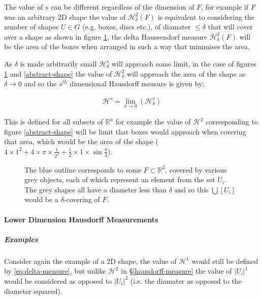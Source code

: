 \documentclass[a4paper,11pt,twoside]{article}
\begin{document}
The value of \(s\) can be different regardless of the dimension of \(F\), for example if \(F\) was an arbitrary 2D shape the value of \(\mathcal{H}_{\delta}^{2}\left(F\right)\)
is equivalent to considering the number of shapes \(U\in G\) (e.g. boxes, discs etc.), of
diamater \(\leq \delta\) that will cover over a shape as shown in figure
\ref{hausdorff-covering}, the delta Haussendorf measure
\(\mathcal{H}^{2}_{\delta} \left(F\right)\) will be the area of the boxes when
arranged in such a way that minimises the area.

As \(\delta\) is made arbitrarily small \(\mathcal{H}_{\delta}^{s}\) will approach some limit, in the case of figures \ref{hausdorff-covering}  and \ref{abstract-shape} the value of \(\mathcal{H}^{2}_{\delta}\) will approach the area of the shape as \(\delta \rightarrow 0\) and so the \(s^{th}\) dimensional Hausdorff measure is given by:

\begin{align}
\mathcal{H}^{s} = \lim_{\delta \rightarrow 0}\left( \mathcal{H}^{s}_{\delta} \right) \label{eq:limit-haus}
\end{align}

This is defined for all subsets of \(\mathbb{R}^n\) for example the value of  \(\mathcal{H}^{2}\) corresponding to figure \ref{abstract-shape} will be limit that boxes would approach when covering that area, which would be the area of the shape (\(4\times 1^2 + 4\times \pi\times \frac{1}{2^2} + \frac{1}{2}\times 1 \times \sin{\frac{\pi}{3}}\)).





\begin{figure}
\centering

\caption{\label{hausdorff-covering}The blue outline corresponds to some \(F \subset \mathbb{R}^{2}\), covered by various grey objects, each of which represent an element from the set \(U_{i}\). The grey shapes all have a diameter less than \(\delta\) and so this  \(\bigcup \left[U_{i}\right]\) would be a \(\delta\)-covering of \(F\).}
\end{figure}




\paragraph{Lower Dimension Hausdorff Measurements}
\label{sec:org5baa1e8}
\subparagraph{Examples}
\label{sec:org53aab8b}
Consider again the example of a 2D shape, the value of \(\mathcal{H}^{1}\) would still be defined by \eqref{eq:delta-measure}, but unlike \(\mathcal{H}^{2}\) in \S \ref{hausdorff-measure} the value of \(\left\lvert U_i \right\rvert^1\) would be considered as opposed to \(\left\lvert U_i \right\rvert^2\) (i.e. the diamater as opposed to the diameter squared).
\end{document}
